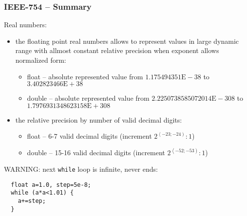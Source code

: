 \documentclass{beamer}
\begin{document}
\begin{frame}[fragile]
\frametitle{IEEE-754 -- Summary}

Real numbers:
\begin{itemize}
\item the floating point real numbers allows to represent values in large dynamic range with allmost constant relative precision when exponent allows normalized form:
\begin{itemize}
\item float -- absolute represented value from $1.175494351\text{E}-38$ to $3.402823466\text{E} + 38$
\item double -- absolute represented value from $2.2250738585072014\text{E} - 308$ to $1.7976931348623158\text{E} + 308$
\end{itemize}
\item the relative precision by number of valid decimal digits:
\begin{itemize}
\item float --  6-7 valid decimal digits (increment $2^{\left\langle -23; -24\right)} : 1$)
\item double -- 15-16 valid decimal digits (increment $2^{\left\langle -52; -53\right)} : 1$)
\end{itemize}
\end{itemize}

WARNING: next \texttt{while} loop is infinite, never ends:
\begin{verbatim}
  float a=1.0, step=5e-8;
  while (a*a<1.01) {
    a+=step;
  }
\end{verbatim}
\end{frame}
\end{document}
